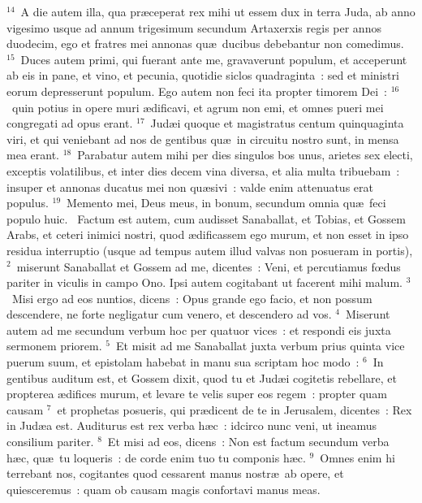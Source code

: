 ${}^{14}$~A die autem illa, qua pr\ae ceperat rex mihi ut essem dux in terra Juda, ab anno vigesimo usque ad annum trigesimum secundum Artaxerxis regis per annos duodecim, ego et fratres mei annonas qu\ae\ ducibus debebantur non comedimus.
${}^{15}$~Duces autem primi, qui fuerant ante me, gravaverunt populum, et acceperunt ab eis in pane, et vino, et pecunia, quotidie siclos quadraginta~: sed et ministri eorum depresserunt populum. Ego autem non feci ita propter timorem Dei~:
${}^{16}$~quin potius in opere muri \ae dificavi, et agrum non emi, et omnes pueri mei congregati ad opus erant.
${}^{17}$~Jud\ae i quoque et magistratus centum quinquaginta viri, et qui veniebant ad nos de gentibus qu\ae\ in circuitu nostro sunt, in mensa mea erant.
${}^{18}$~Parabatur autem mihi per dies singulos bos unus, arietes sex electi, exceptis volatilibus, et inter dies decem vina diversa, et alia multa tribuebam~: insuper et annonas ducatus mei non qu\ae sivi~: valde enim attenuatus erat populus.
${}^{19}$~Memento mei, Deus meus, in bonum, secundum omnia qu\ae\ feci populo huic.
~\lettrine[lines=10,image=true,loversize=0.05,lraise=-0.03]{F}{}actum est autem, cum audisset Sanaballat, et Tobias, et Gossem Arabs, et ceteri inimici nostri, quod \ae dificassem ego murum, et non esset in ipso residua interruptio (usque ad tempus autem illud valvas non posueram in portis),
${}^{2}$~miserunt Sanaballat et Gossem ad me, dicentes~: Veni, et percutiamus fœdus pariter in viculis in campo Ono. Ipsi autem cogitabant ut facerent mihi malum.
${}^{3}$~Misi ergo ad eos nuntios, dicens~: Opus grande ego facio, et non possum descendere, ne forte negligatur cum venero, et descendero ad vos.
${}^{4}$~Miserunt autem ad me secundum verbum hoc per quatuor vices~: et respondi eis juxta sermonem priorem.
${}^{5}$~Et misit ad me Sanaballat juxta verbum prius quinta vice puerum suum, et epistolam habebat in manu sua scriptam hoc modo~:
${}^{6}$~In gentibus auditum est, et Gossem dixit, quod tu et Jud\ae i cogitetis rebellare, et propterea \ae difices murum, et levare te velis super eos regem~: propter quam causam
${}^{7}$~et prophetas posueris, qui pr\ae dicent de te in Jerusalem, dicentes~: Rex in Jud\ae a est. Auditurus est rex verba h\ae c~: idcirco nunc veni, ut ineamus consilium pariter.
${}^{8}$~Et misi ad eos, dicens~: Non est factum secundum verba h\ae c, qu\ae\ tu loqueris~: de corde enim tuo tu componis h\ae c.
${}^{9}$~Omnes enim hi terrebant nos, cogitantes quod cessarent manus nostr\ae\ ab opere, et quiesceremus~: quam ob causam magis confortavi manus meas.



